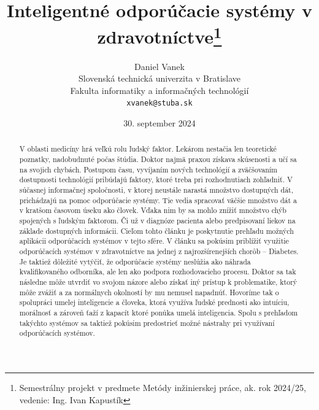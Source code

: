 \documentclass[10pt,twoside,slovak,a4paper]{article}
\title{Inteligentné odporúčacie systémy v zdravotníctve\thanks{Semestrálny projekt v predmete Metódy inžinierskej práce, ak. rok 2024/25, vedenie: Ing. Ivan Kapustík}} %
\author{Daniel Vanek\\[2pt]
	{\small Slovenská technická univerzita v Bratislave}\\
	{\small Fakulta informatiky a informačných technológií}\\
	{\small \texttt{xvanek@stuba.sk}}
	}
\date{\small 30. september 2024} %
\begin{document}
\maketitle

\begin{abstract}
V oblasti medicíny hrá veľkú rolu ľudský faktor. Lekárom nestačia len teoretické poznatky, nadobudnuté počas štúdia. Doktor najmä praxou získava skúsenosti a učí sa na svojich chybách. Postupom času, vyvíjaním nových technológií a zväčšovaním dostupnosti technológií pribúdajú faktory, ktoré treba pri rozhodnutiach zohľadniť. V súčasnej informačnej spoločnosti, v ktorej neustále narastá množstvo dostupných dát, prichádzajú na pomoc odporúčacie systémy. Tie vedia spracovať väčšie množstvo dát a v kratšom časovom úseku ako človek. Vďaka nim by sa mohlo znížiť množstvo chýb spojených s ľudským faktorom. Či už v diagnóze pacienta alebo predpisovaní liekov na základe dostupných informácii. Cieľom tohto článku je poskytnutie prehľadu možných aplikácii odporúčacích systémov v tejto sfére. V článku sa pokúsim priblížiť využitie odporúčacích systémov v zdravotníctve na jednej z najrozšírenejších chorôb – Diabetes. Je taktiež dôležité vytýčiť, že odporúčacie systémy neslúžia ako náhrada kvalifikovaného odborníka, ale len ako podpora rozhodovacieho procesu. Doktor sa tak následne môže utvrdiť vo svojom názore alebo získať iný prístup k problematike, ktorý môže zvážiť a za normálnych okolností by mu nemusel napadnúť.  Hovoríme tak o spolupráci umelej inteligencie a človeka, ktorá využíva ľudské prednosti ako intuíciu, morálnosť a zároveň ťaží z kapacít ktoré ponúka umelá inteligencia. Spolu s prehľadom takýchto systémov sa taktiež pokúsim predostrieť možné nástrahy pri využívaní odporúčacích systémov. 
\end{abstract}
\end{document}
